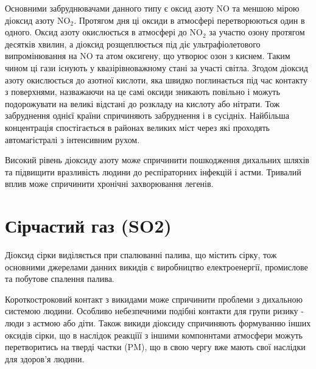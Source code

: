 \begin{center}
\end{center}

\vspace{0.75cm}



Основними забруднювачами данного типу є оксид азоту $\mathrm{NO}$ та меншою мірою 
діоксид азоту $\mathrm{NO}_2$. Протягом дня ці оксиди в атмосфері перетворюються один в одного. 
Оксид азоту окислюється в атмосфері до $\mathrm{NO}_2$ за участю озону протягом десятків 
хвилин, а діоксид розщеплюється під діє ультрафіолетового випромінювання на $\mathrm{NO}$ та 
атом оксигену, що утворює озон з киснем. Таким чином ці гази існують у квазірівноважному стані 
за участі світла. Згодом діоксид азоту окислюється до азотної кислоти, яка швидко поглинається 
під час контакту з поверхнями, назважаючи на це самі оксиди зникають повільно і 
можуть подорожувати на великі відстані до розкладу на кислоту або нітрати. Тож забруднення 
однієї країни спричиняють забруднення і в сусідніх. Найбільша концентрація 
спостігається в районах великих міст через які проходять автомагістралі з інтенсивним рухом.

Високий рівень діоксиду азоту може спричинити пошкодження дихальних шляхів та 
підвищити вразливість людини до респіраторних інфекцій і астми.
Тривалий вплив може спричинити хронічні захворювання легенів.


\section{Сірчастий газ (SO2)}

Діоксид сірки виділяється при спалюванні палива, що містить сірку, тож основними джерелами 
данних викидів є виробництво електроенергії, промислове та побутове спалення палива. 


Короткостроковий контакт з викидами може спричинити проблеми з дихальною 
системою людини. Особливо небезпечними подібні контакти для групи ризику - 
люди з астмою або діти. Також викиди діоксиду спричиняють формуванню інших 
оксидів сірки, що в наслідок реакціїї з іншими компоннтами атмосфери можуть 
перетворитись на тверді частки (PM), що в свою чергу вже мають свої 
наслідки для здоров'я людини.


